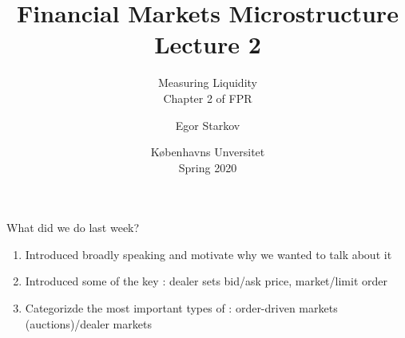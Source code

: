 \documentclass[english,10pt
,aspectratio=169
]{beamer}
\title{Financial Markets Microstructure \\ Lecture 2}
\subtitle{Measuring Liquidity \\
Chapter 2 of FPR}
\author{Egor Starkov}
\date{K{\o}benhavns Unversitet \\
	Spring 2020}
\begin{document}
\frame[plain]{\titlepage}




\begin{frame}{What did we do last week?}
	\begin{enumerate}
		\item Introduced  broadly speaking and motivate why we wanted to talk about it
		\item Introduced some of the key : dealer sets bid/ask price, market/limit order
		\item Categorizde the most important types of :  order-driven markets (auctions)/dealer markets
	\end{enumerate}
\end{frame}


%
%
\end{document}
